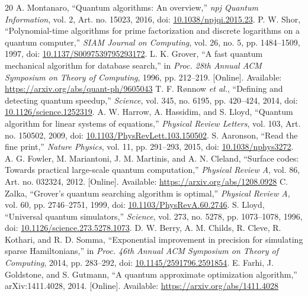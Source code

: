 \documentclass[conference]{IEEEtran}
\begin{document}
\begin{thebibliography}{20}
 A. Montanaro, ``Quantum algorithms: An overview,'' \emph{npj Quantum Information}, vol. 2, Art. no. 15023, 2016, doi: \href{https://doi.org/10.1038/npjqi.2015.23}{10.1038/npjqi.2015.23}.
 P. W. Shor, ``Polynomial-time algorithms for prime factorization and discrete logarithms on a quantum computer,'' \emph{SIAM Journal on Computing}, vol. 26, no. 5, pp. 1484--1509, 1997, doi: \href{https://doi.org/10.1137/S0097539795293172}{10.1137/S0097539795293172}.
 L. K. Grover, ``A fast quantum mechanical algorithm for database search,'' in \emph{Proc. 28th Annual ACM Symposium on Theory of Computing}, 1996, pp. 212--219. [Online]. Available: \url{https://arxiv.org/abs/quant-ph/9605043}
 T. F. R\o nnow \emph{et al.}, ``Defining and detecting quantum speedup,'' \emph{Science}, vol. 345, no. 6195, pp. 420--424, 2014, doi: \href{https://doi.org/10.1126/science.1252319}{10.1126/science.1252319}.
 A. W. Harrow, A. Hassidim, and S. Lloyd, ``Quantum algorithm for linear systems of equations,'' \emph{Physical Review Letters}, vol. 103, Art. no. 150502, 2009, doi: \href{https://doi.org/10.1103/PhysRevLett.103.150502}{10.1103/PhysRevLett.103.150502}.
 S. Aaronson, ``Read the fine print,'' \emph{Nature Physics}, vol. 11, pp. 291--293, 2015, doi: \href{https://doi.org/10.1038/nphys3272}{10.1038/nphys3272}.
 A. G. Fowler, M. Mariantoni, J. M. Martinis, and A. N. Cleland, ``Surface codes: Towards practical large-scale quantum computation,'' \emph{Physical Review A}, vol. 86, Art. no. 032324, 2012. [Online]. Available: \url{https://arxiv.org/abs/1208.0928}
 C. Zalka, ``Grover's quantum searching algorithm is optimal,'' \emph{Physical Review A}, vol. 60, pp. 2746--2751, 1999, doi: \href{https://doi.org/10.1103/PhysRevA.60.2746}{10.1103/PhysRevA.60.2746}.
 S. Lloyd, ``Universal quantum simulators,'' \emph{Science}, vol. 273, no. 5278, pp. 1073--1078, 1996, doi: \href{https://doi.org/10.1126/science.273.5278.1073}{10.1126/science.273.5278.1073}.
 D. W. Berry, A. M. Childs, R. Cleve, R. Kothari, and R. D. Somma, ``Exponential improvement in precision for simulating sparse Hamiltonians,'' in \emph{Proc. 46th Annual ACM Symposium on Theory of Computing}, 2014, pp. 283--292, doi: \href{https://doi.org/10.1145/2591796.2591854}{10.1145/2591796.2591854}.
 E. Farhi, J. Goldstone, and S. Gutmann, ``A quantum approximate optimization algorithm,'' arXiv:1411.4028, 2014. [Online]. Available: \url{https://arxiv.org/abs/1411.4028}

\end{thebibliography}
\end{document}
